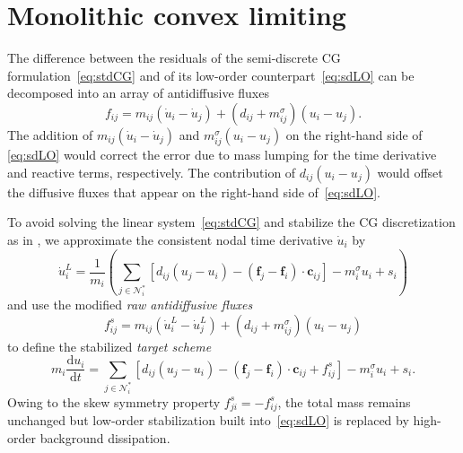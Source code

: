\documentclass[preprint, 11pt]{elsarticle}
\newcommand{\diff}{\mathrm{d} }
\newcommand{\N}{\mathcal{N}}
\newcommand{\f}{\mathbf{f}}
\newcommand{\con}{\mathbf{c}}
\begin{document}
\section{Monolithic convex limiting}
\label{sec:MCL}
The difference between the residuals of the semi-discrete CG formulation~\eqref{eq:stdCG} and of its low-order counterpart~\eqref{eq:sdLO} can be decomposed into an array of antidiffusive fluxes
\begin{equation}\label{eq:CGADF}
    f_{ij} = m_{ij} (\dot{u}_i - \dot u_j) + (d_{ij} + m_{ij}^{\sigma}) (u_i - u_j).
\end{equation}
The addition of $m_{ij} (\dot{u}_i - \dot u_j)$ and $m_{ij}^{\sigma} (u_i - u_j)$
on the right-hand side of \eqref{eq:sdLO} would correct the error due to mass lumping for the time derivative and reactive terms, respectively. The contribution of $d_{ij}(u_i- u_j)$ would offset the diffusive fluxes that appear on the right-hand side of~\eqref{eq:sdLO}.

To avoid solving the linear system~\eqref{eq:stdCG} and stabilize the
CG discretization as in \cite{kuzmin2020,kuzmin2023,lohmann2019},
we approximate the consistent nodal time derivative $\dot u_i$ by
\begin{equation*}
    \dot u_i^L = \frac{1}{m_i}\left(\sum_{j \in\N_i^*} \left[d_{ij} (u_j -u_i) - (\f_j-\f_i)\cdot \con_{ij}\right] - m_i^{\sigma}u_i + s_i\right)
\end{equation*}
and use the modified \emph{raw antidiffusive fluxes}  
\begin{equation}\label{eq:rawADF}
    f_{ij}^s = m_{ij} (\dot{u}^L_i - \dot u_j^L) + (d_{ij} + m_{ij}^{\sigma}) (u_i - u_j)
\end{equation}
to define the stabilized \emph{target scheme} 
\begin{equation}\label{target}
m_i\frac{\diff u_i}{\diff t} = \sum_{j \in\N_i^*} \left[d_{ij} (u_j -u_i) - (\f_j-\f_i)\cdot \con_{ij} + f_{ij}^s\right] - m_i^{\sigma}u_i + s_i.
\end{equation}
Owing to the skew symmetry property $f_{ji}^s = -f_{ij}^s$, the total mass
remains unchanged but low-order stabilization built into~\eqref{eq:sdLO} 
is replaced by high-order
background dissipation.
\medskip
\end{document}
